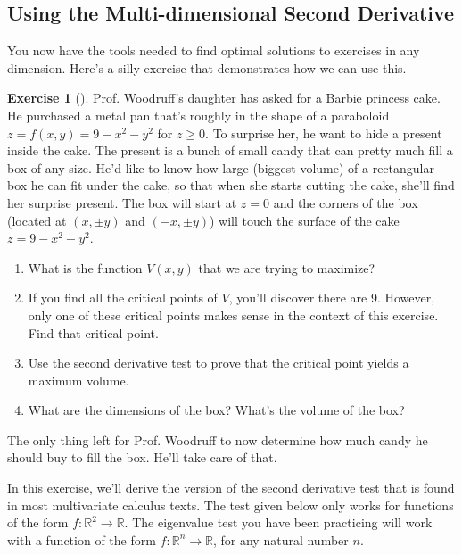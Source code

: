 \documentclass[10pt,]{book}
\theoremstyle{plain}
\theoremstyle{definition}
\theoremstyle{definition}
\theoremstyle{definition}
\theoremstyle{definition}
\newtheorem{exploration}[project]{Exercise}
\theoremstyle{definition}
\numberwithin{equation}{section}
\begin{document}
\subsection[{Using the Multi-dimensional Second Derivative}]{Using the Multi-dimensional Second Derivative}\label{subsection-60}
You now have the tools needed to find optimal solutions to exercises in any dimension. Here's a silly exercise that demonstrates how we can use this.%
\begin{exploration}[]\label{optimize_box_in_cake}
Prof. Woodruff's daughter has asked for a Barbie princess cake. He purchased a metal pan that's roughly in the shape of a paraboloid \(z=f(x,y)=9-x^2-y^2\) for \(z\geq 0\). To surprise her, he want to hide a present inside the cake. The present is a bunch of small candy that can pretty much fill a box of any size. He'd like to know how large (biggest volume) of a rectangular box he can fit under the cake, so that when she starts cutting the cake, she'll find her surprise present. The box will start at \(z=0\) and the corners of the box (located at \((x,\pm y)\) and \((-x,\pm y)\)) will touch the surface of the cake \(z=9-x^2-y^2\).%
\begin{enumerate}[font=\bfseries,label=(\alph*),ref=\alph*]
\item\label{task-647} What is the function \(V(x,y)\) that we are trying to maximize?%
\item\label{task-648} If you find all the critical points of \(V\), you'll discover there are 9.  However, only one of these critical points makes sense in the context of this exercise. Find that critical point.%
\item\label{task-649} Use the second derivative test to prove that the critical point yields a maximum volume.%
\item\label{task-650} What are the dimensions of the box? What's the volume of the box?%
\end{enumerate}
\bigbreak
The only thing left for Prof. Woodruff to now determine how much candy he should buy to fill the box. He'll take care of that.%
\end{exploration}
In this exercise, we'll derive the version of the second derivative test that is found in most multivariate calculus texts. The test given below only works for functions of the form \(f:\mathbb{R}^2\to\mathbb{R}\). The eigenvalue test you have been practicing will work with a function of the form \(f:\mathbb{R}^n\to\mathbb{R}\), for any natural number \(n\).%
\end{document}
